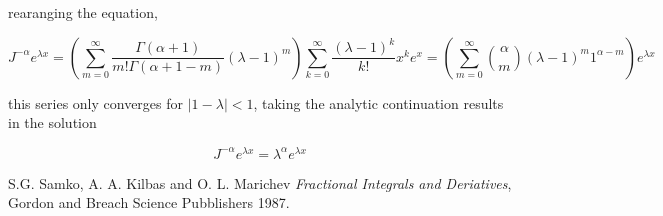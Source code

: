 \documentclass[%
 preprint,
 amsmath, amssymb, aps, pra, 10pt
]{revtex4-2}
\begin{document}
rearanging the equation,

\[J^{-\alpha} e^{\lambda x} = \left(\sum_{m=0}^\infty \frac{\Gamma(\alpha + 1)}{m!\Gamma(\alpha + 1 - m)}(\lambda - 1)^m\right) \sum_{k=0}^\infty \frac{(\lambda - 1)^k}{k!}x^k e^x = \left(\sum_{m=0}^\infty \binom{\alpha}{m}(\lambda - 1)^m 1^{\alpha - m}\right) e^{\lambda x}\]

this series only converges for $\left|1 - \lambda\right| < 1$, taking the analytic continuation results in the solution

 \[J^{-\alpha} e^{\lambda x} = \lambda^\alpha e^{\lambda x}\]

\begin{thebibliography}{1}

  S.G. Samko, A. A. Kilbas and O. L. Marichev
  \textit{Fractional Integrals and Deriatives},
  Gordon and Breach Science Pubblishers
  1987.

\end{thebibliography}
\end{document}
